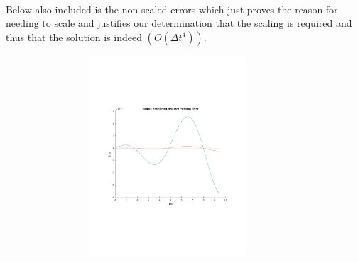 \documentclass{article}
\begin{document}
\\
Below also included is the non-scaled errors which just proves the reason for needing to scale and justifies our determination that the scaling is required and thus that the solution is indeed $(O(\Delta t^4))$.\\
\begin{figure}[!h]
    \centering
    \includegraphics[width=10cm, height=7.5cm]{figures/sho_nonScaledErrors.pdf}
\end{figure}
\end{document}
